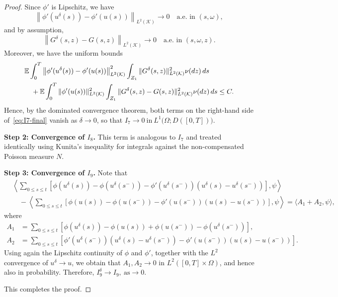 \documentclass[11pt]{article}
\theoremstyle{plain}
\numberwithin{equation}{section}
\begin{document}
\begin{proof}
\smallskip
\noindent Since $\phi'$ is Lipschitz, we have
\[
\left\| \phi'(u^\delta(s)) - \phi'(u(s)) \right\|_{L^2(\mathcal{K})} \longrightarrow 0
\quad \text{a.e. in } (s,\omega),
\]
and by assumption,
\[
\left\| G^\delta(s,z) - G(s,z) \right\|_{L^2(\mathcal{K})} \longrightarrow 0
\quad \text{a.e. in } (s,\omega,z).
\]
Moreover, we have the uniform bounds
\begin{align}\label{eq:I7-uniform}
&\mathbb{E} \int_0^T \left\| \phi'(u^\delta(s)) - \phi'(u(s)) \right\|_{L^2(\mathcal{K})}^2
\int_{Z_1} \|G^\delta(s,z)\|_{L^2(\mathcal{K})}^2 \nu(dz)\, ds \notag\\
&\quad+ \mathbb{E} \int_0^T \| \phi'(u(s)) \|_{L^2(\mathcal{K})}^2
\int_{Z_1} \|G^\delta(s,z) - G(s,z)\|_{L^2(\mathcal{K})}^2 \nu(dz)\, ds
\le C.
\end{align}
Hence, by the dominated convergence theorem, both terms on the right-hand side of~\eqref{eq:I7-final} vanish as $\delta \to 0$, so that $I_7 \to 0~   \text{in} ~L^1\big(\Omega; D([0,T])\big)$.

 
\smallskip\noindent
\textbf{Step 2: Convergence of $I_8$.}
This term is analogous to $I_7$ and treated identically using Kunita’s inequality for integrals against the non-compensated Poisson measure $N$.

\smallskip\noindent
\textbf{Step 3: Convergence of $I_9$.}
Note that
\begin{align}\label{ap-7}
&\left\langle \sum_{0\le s \le t} \left[ \phi(u^\delta(s)) - \phi(u^\delta(s^-)) - \phi'(u^\delta(s^-))(u^\delta(s)-u^\delta(s^-)) \right], \psi \right\rangle \nonumber\\
&\quad - \left\langle \sum_{0\le s \le t} \left[ \phi(u(s)) - \phi(u(s^-)) - \phi'(u(s^-))(u(s)-u(s^-)) \right], \psi \right\rangle  
 = \langle A_1 + A_2, \psi \rangle,
\end{align}
where
\begin{align*}
A_1 &= \sum_{0\le s\le t} \left[ \phi(u^\delta(s)) - \phi(u(s)) + \phi(u(s^-)) - \phi(u^\delta(s^-)) \right],\\
A_2 &= \sum_{0\le s\le t} \left[ \phi'(u^\delta(s^-))(u^\delta(s)-u^\delta(s^-)) - \phi'(u(s^-))(u(s)-u(s^-)) \right].
\end{align*}
Using again the Lipschitz continuity of $\phi$ and $\phi'$, together with the $L^2$ convergence of $u^\delta \to u$, we obtain that $A_1, A_2 \to 0$ in $L^2([0,T]\times\Omega)$, and hence also in probability. Therefore, \(I_9^\delta \to I_9, ~ \text{as} \to 0.\)

This completes the proof.
 
 
 

\end{proof}
\end{document}
